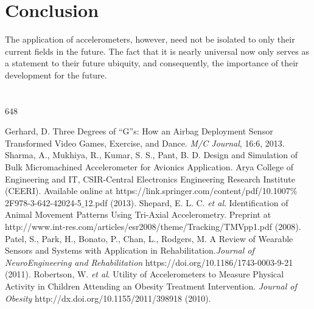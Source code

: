 \documentclass[titlepage]{article}
\begin{document}
\section*{Conclusion}

The application of accelerometers, however, need not be isolated to only their current fields in the future. The fact that it is nearly universal now only serves as a statement to their future ubiquity, and consequently, the importance of their development for the future.

\section*{}
648

\pagebreak

\begin{thebibliography}{1}
Gerhard, D. Three Degrees of “G”s: How an Airbag Deployment Sensor Transformed Video Games, Exercise, and Dance. \textit{M/C Journal}, 16:6, 2013. 
Sharma, A., Mukhiya, R., Kumar, S. S., Pant, B. D. Design and Simulation of Bulk Micromachined Accelerometer for Avionics Application. Arya College of Engineering and IT, CSIR-Central Electronics Engineering Research Institute (CEERI). Available online at https://link.springer.com/content/pdf/10.1007$\%$2F978-3-642-42024-5$\_$12.pdf (2013).
Shepard, E. L. C. \textit{et al}. Identification of Animal Movement Patterns Using Tri-Axial Accelerometry. Preprint at http://www.int-res.com/articles/esr2008/theme/Tracking/TMVpp1.pdf (2008).
Patel, S., Park, H., Bonato, P., Chan, L., Rodgers, M. A Review of Wearable Sensors and Systems with Application in Rehabilitation.\textit{Journal of NeuroEngineering and Rehabilitation} https://doi.org/10.1186/1743-0003-9-21 (2011).
Robertson, W. \textit{et al}. Utility of Accelerometers to Measure Physical Activity in Children Attending an Obesity Treatment Intervention. \textit{Journal of Obesity} http://dx.doi.org/10.1155/2011/398918 (2010).
\end{thebibliography}
\end{document}
